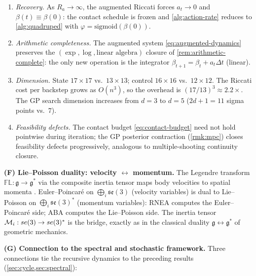 \begin{remark}
\label{rem:action-rate-recovery}
\begin{enumerate}[label=(\roman*),nosep]
\item \emph{Recovery.}
  As $R_a \to \infty$, the augmented Riccati forces $a_t \to 0$
  and $\beta(t) \equiv \beta(0)$: the contact schedule is
  frozen and \cref{alg:action-rate} reduces to
  \cref{alg:quadruped} with $\varphi = \mathrm{sigmoid}(\beta(0))$.
\item \emph{Arithmetic completeness.}
  The augmented system \eqref{eq:augmented-dynamics} preserves
  the $(\exp, \log, \text{linear algebra})$ closure of
  \cref{rem:arithmetic-complete}: the only new operation is the
  integrator $\beta_{t+1} = \beta_t + a_t\Delta t$ (linear).
\item \emph{Dimension.}
  State $17 \times 17$ vs.\ $13 \times 13$; control $16 \times 16$
  vs.\ $12 \times 12$.
  The Riccati cost per backstep grows as $O(n^3)$,
  so the overhead is $(17/13)^3 \approx 2.2\times$.
  The GP search dimension increases from $d = 3$ to $d = 5$
  ($2d{+}1 = 11$ sigma points vs.\ $7$).
\item \emph{Feasibility defects.}
  The contact budget \eqref{eq:contact-budget} need not hold
  pointwise during iteration; the GP posterior contraction
  (\cref{rmk:mpc}) closes feasibility defects progressively,
  analogous to multiple-shooting continuity closure.
\end{enumerate}
\end{remark}

\medskip\noindent\textbf{(F) Lie--Poisson duality: velocity
$\leftrightarrow$ momentum.}
The Legendre transform $\mathbb{FL}: \mathfrak{g} \to \mathfrak{g}^*$ via the
composite inertia tensor maps body velocities to spatial momenta
\cite{MarsdenRatiu}.
Euler--Poincar\'e on $\bigoplus_i \mathfrak{se}(3)$ (velocity variables) is
dual to Lie--Poisson on $\bigoplus_i \mathfrak{se}(3)^*$ (momentum
variables):
RNEA computes the Euler--Poincar\'e side; ABA computes the Lie--Poisson side.
The inertia tensor
$\mathcal{M}_i : se(3) \to se(3)^*$ is the bridge, exactly as
in the classical duality $\mathfrak{g} \leftrightarrow \mathfrak{g}^*$ of
geometric mechanics.

\medskip\noindent\textbf{(G) Connection to the spectral and
stochastic framework.}
Three connections tie the recursive dynamics to the preceding results (\cref{sec:cycle,sec:spectral}):

